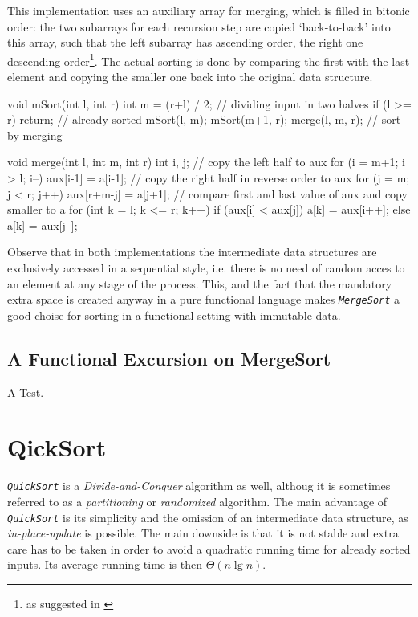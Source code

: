 \begin{impl}
This implementation uses an auxiliary array for merging, which is filled in bitonic order:
the two subarrays for each recursion step are copied `back-to-back' into this array, such that the left subarray has ascending order, the right one descending order\footnote{as suggested in \autocite[chapter 8]{algsc98}}.
The actual sorting is done by comparing the first with the last element and copying the smaller one back into the original data structure.
\end{impl}

\begin{javacode}
void mSort(int l, int r) {
    int m = (r+l) / 2; // dividing input in two halves
    if (l >= r) return; // already sorted
    mSort(l, m);
    mSort(m+1, r);
    merge(l, m, r); // sort by merging
}

void merge(int l, int m, int r) {
    int i, j;
    // copy the left half to aux
    for (i = m+1; i > l; i--) aux[i-1] = a[i-1];
    // copy the right half in reverse order to aux
    for (j = m; j < r; j++) aux[r+m-j] = a[j+1];
    // compare first and last value of aux and copy smaller to a
    for (int k = l; k <= r; k++) {
        if (aux[i] < aux[j]) a[k] = aux[i++];
        else a[k] = aux[j--];
    }
}
\end{javacode}

Observe that in both implementations the intermediate data structures are exclusively accessed in a sequential style, i.e. there is no need of random acces to an element at any stage of the process.
This, and the fact that the mandatory extra space is created anyway in a pure functional language makes \emph{\texttt{MergeSort}} a good choise for sorting in a functional setting with immutable data.

\subsection{A Functional Excursion on MergeSort}
    A Test.


\section{QickSort}

\emph{\texttt{QuickSort}} is a \emph{Divide-and-Conquer} algorithm as well, althoug it is sometimes referred to as a \emph{partitioning} or \emph{randomized} algorithm.
The main advantage of \emph{\texttt{QuickSort}} is its simplicity and the omission of an intermediate data structure, as \emph{in-place-update} is possible.
The main downside is that it is not stable and extra care has to be taken in order to avoid a quadratic running time for already sorted inputs. Its average running time is then $\Theta (n \lg n)$.

